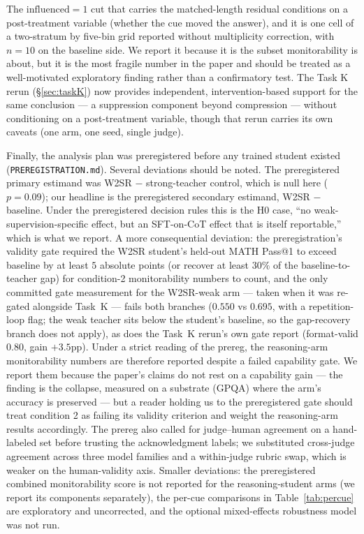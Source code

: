 \documentclass{article}
\begin{document}
The $\mathrm{influenced} = 1$ cut that carries the matched-length residual
conditions on a post-treatment variable (whether the cue moved the answer), and
it is one cell of a two-stratum by five-bin grid reported without multiplicity
correction, with $n = 10$ on the baseline side. We report it because it is the
subset monitorability is about, but it is the most fragile number in the paper
and should be treated as a well-motivated exploratory finding rather than a
confirmatory test. The Task K rerun (\S\ref{sec:taskK}) now provides
independent, intervention-based support for the same conclusion --- a
suppression component beyond compression --- without conditioning on a
post-treatment variable, though that rerun carries its own caveats (one arm,
one seed, single judge).

Finally, the analysis plan was preregistered before any trained student
existed (\texttt{PREREGISTRATION.md}). Several deviations should be noted. The
preregistered primary estimand was W2SR $-$ strong-teacher control, which is
null here ($p = 0.09$); our headline is the preregistered secondary estimand,
W2SR $-$ baseline. Under the preregistered decision rules this is the H0 case,
``no weak-supervision-specific effect, but an SFT-on-CoT effect that is itself
reportable,'' which is what we report. A more consequential deviation: the
preregistration's validity gate required the W2SR student's held-out MATH
Pass@1 to exceed baseline by at least $5$ absolute points (or recover at
least $30\%$ of the baseline-to-teacher gap) for condition-2 monitorability
numbers to count, and the only committed gate measurement for the W2SR-weak
arm --- taken when it was re-gated alongside Task~K --- fails both branches
($0.550$ vs $0.695$, with a repetition-loop flag; the weak teacher sits below
the student's baseline, so the gap-recovery branch does not apply), as does
the Task~K rerun's own gate report (format-valid $0.80$, gain $+3.5$pp).
Under a strict reading of the prereg, the reasoning-arm monitorability
numbers are therefore reported despite a failed capability gate. We report
them because the paper's claims do not rest on a capability gain --- the
finding is the collapse, measured on a substrate (GPQA) where the arm's
accuracy is preserved --- but a reader holding us to the preregistered gate
should treat condition 2 as failing its validity criterion and weight the
reasoning-arm results accordingly. The prereg also called for judge--human
agreement on a hand-labeled set before trusting the acknowledgment labels; we
substituted cross-judge agreement across three model families and a
within-judge rubric swap, which is weaker on the human-validity axis. Smaller
deviations: the preregistered combined monitorability score is not reported
for the reasoning-student arms (we report its components separately), the
per-cue comparisons in Table~\ref{tab:percue} are exploratory and uncorrected,
and the optional mixed-effects robustness model was not run.
\end{document}
